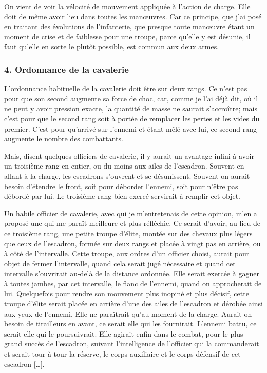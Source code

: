 \documentclass[french,twoside]{book} %
\begin{document}
On vient de voir la vélocité de mouvement appliquée à l’action de charge. Elle doit de même avoir lieu dans toutes les manœuvres. Car ce principe, que j’ai posé en traitant des évolutions de l’infanterie, que presque toute manœuvre étant un moment de crise et de faiblesse pour une troupe, parce qu’elle y est désunie, il faut qu’elle en sorte le plutôt possible, est commun aux deux armes.
\subsubsection[{4. Ordonnance de la cavalerie}]{4. Ordonnance de la cavalerie}
\noindent L’ordonnance habituelle de la cavalerie doit être sur deux rangs. Ce n’est pas pour que son second augmente sa force de choc, car, comme je l’ai déjà dit, où il ne peut y avoir pression exacte, la quantité de masse ne saurait s’accroître; mais c’est pour que le second rang soit à portée de remplacer les pertes et les vides du premier. C’est pour qu’arrivé sur l’ennemi et étant mêlé avec lui, ce second rang augmente le nombre des combattants.\par
Mais, disent quelques officiers de cavalerie, il y aurait un avantage infini à avoir un troisième rang en entier, ou du moins aux ailes de l’escadron. Souvent en allant à la charge, les escadrons s’ouvrent et se désunissent. Souvent on aurait besoin d’étendre le front, soit pour déborder l’ennemi, soit pour n’être pas débordé par lui. Le troisième rang bien exercé servirait à remplir cet objet.\par
Un habile officier de cavalerie, avec qui je m’entretenais de cette opinion, m’en a proposé une qui me paraît meilleure et plus réfléchie. Ce serait d’avoir, au lieu de ce troisième rang, une petite troupe d’élite, montée sur des chevaux plus légers que ceux de l’escadron, formée sur deux rangs et placée à vingt pas en arrière, ou à côté de l’intervalle. Cette troupe, aux ordres d’un officier choisi, aurait pour objet de fermer l’intervalle, quand cela serait jugé nécessaire et quand cet intervalle s’ouvrirait au-delà de la distance ordonnée. Elle serait exercée à gagner à toutes jambes, par cet intervalle, le flanc de l’ennemi, quand on approcherait de lui. Quelquefois pour rendre son mouvement plus inopiné et plus décisif, cette troupe d’élite serait placée en arrière d’une des ailes de l’escadron et dérobée ainsi aux yeux de l’ennemi. Elle ne paraîtrait qu’au moment de la charge. Aurait-on besoin de tirailleurs en avant, ce serait elle qui les fournirait. L’ennemi battu, ce serait elle qui le poursuivrait. Elle agirait enfin dans le combat, pour le plus grand succès de l’escadron, suivant l’intelligence de l’officier qui la commanderait et serait tour à tour la réserve, le corps auxiliaire et le corps défensif de cet escadron […].
\end{document}
